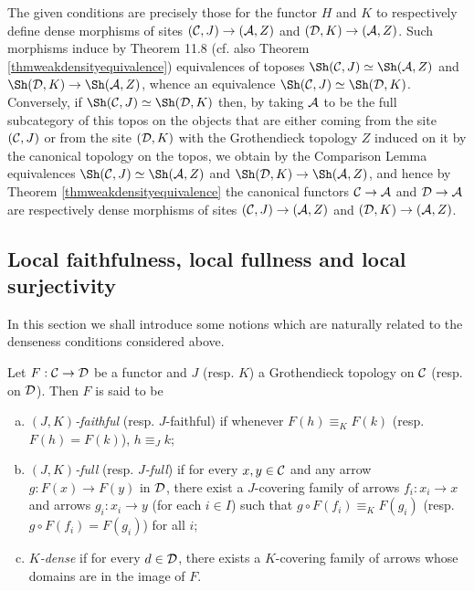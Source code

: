 \documentclass[a4paper,12pt]{article}
\begin{document}
\begin{proofs}
The given conditions are precisely those for the functor $H$ and $K$ to respectively define dense morphisms of sites $({\cal C}, J)\to ({\cal A}, Z)$ and $({\cal D}, K)\to ({\cal A}, Z)$. Such morphisms induce by Theorem 11.8 \cite{Shulman} (cf. also Theorem \ref{thmweakdensityequivalence}) equivalences of toposes $\Sh({\cal C}, J)\simeq \Sh({\cal A}, Z)$ and $\Sh({\cal D}, K)\to \Sh({\cal A}, Z)$, whence an equivalence $\Sh({\cal C}, J)\simeq \Sh({\cal D}, K)$. Conversely, if $\Sh({\cal C}, J)\simeq \Sh({\cal D}, K)$ then, by taking $\cal A$ to be the full subcategory of this topos on the objects that are either coming from the site $({\cal C}, J)$ or from the site $({\cal D}, K)$ with the Grothendieck topology $Z$ induced on it by the canonical topology on the topos, we obtain by the Comparison Lemma equivalences $\Sh({\cal C}, J)\simeq \Sh({\cal A}, Z)$ and $\Sh({\cal D}, K)\to \Sh({\cal A}, Z)$, and hence by Theorem \ref{thmweakdensityequivalence} the canonical functors ${\cal C}\to {\cal A}$ and ${\cal D}\to {\cal A}$ are respectively dense morphisms of sites $({\cal C}, J)\to ({\cal A}, Z)$ and $({\cal D}, K)\to ({\cal A}, Z)$. 
\end{proofs}

\subsection{Local faithfulness, local fullness and local surjectivity}\label{sec:localconditions}

In this section we shall introduce some notions which are naturally related to the denseness conditions considered above.

\begin{definition}\label{deflocalproperties}
	Let $F:{\cal C}\to {\cal D}$ be a functor and $J$ (resp. $K$) a Grothendieck topology on $\cal C$ (resp. on $\cal D$). Then $F$ is said to be 
	\begin{enumerate}[(a)]
		\item \emph{$(J, K)$-faithful} (resp. $J$-faithful) if whenever $F(h)\equiv_{K} F(k)$ (resp. $F(h)=F(k)$), $h\equiv_{J} k$;
		
		\item \emph{$(J, K)$-full} (resp. \emph{$J$-full}) if for every $x, y\in {\cal C}$ and any arrow $g:F(x)\to F(y)$ in $\cal D$, there exist a $J$-covering family of arrows $f_{i}:x_{i}\to x$ and arrows $g_{i}:x_{i}\to y$ (for each $i\in I$) such that $g\circ F(f_{i})\equiv_{K} F(g_{i})$ (resp. $g\circ F(f_{i})= F(g_{i})$) for all $i$;
		
		\item \emph{$K$-dense} if for every $d\in {\cal D}$, there exists a $K$-covering family of arrows whose domains are in the image of $F$. 
	\end{enumerate} 
\end{definition}
\end{document}
